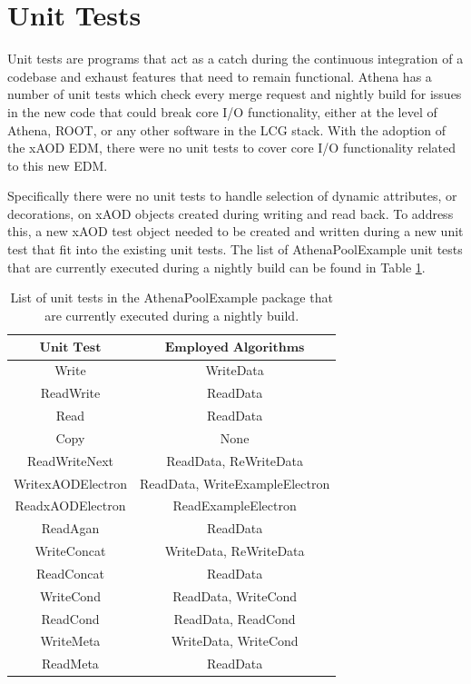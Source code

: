 \section{Unit Tests}
\label{sec:Mod_utests_CI}
Unit tests are programs that act as a catch during the continuous integration of a codebase and exhaust features that need to remain functional. 
Athena has a number of unit tests which check every merge request and nightly build for issues in the new code that could break core I/O functionality, either at the level of Athena, ROOT, or any other software in the LCG stack.
With the adoption of the xAOD EDM, there were no unit tests to cover core I/O functionality related to this new EDM. 

Specifically there were no unit tests to handle selection of dynamic attributes, or decorations, on xAOD objects created during writing and read back.
To address this, a new xAOD test object needed to be created and written during a new unit test that fit into the existing unit tests.
The list of AthenaPoolExample unit tests that are currently executed during a nightly build can be found in Table \ref{tab:CI_Unit_Tests}.

\begin{table}[h]
    \centering
    \begin{tabular}{|c|c|}
        \hline
        $\textbf{Unit Test}$ & $\textbf{Employed Algorithms}$ \\
        \hline
        Write & WriteData \\
        \hline
        ReadWrite & ReadData \\
        \hline
        Read & ReadData \\
        \hline
        Copy & None \\
        \hline
        ReadWriteNext & ReadData, ReWriteData \\
        \hline
        WritexAODElectron & ReadData, WriteExampleElectron \\
        \hline
        ReadxAODElectron & ReadExampleElectron \\
        \hline
        ReadAgan & ReadData \\
        \hline
        WriteConcat & WriteData, ReWriteData \\
        \hline
        ReadConcat & ReadData \\
        \hline
        WriteCond & ReadData, WriteCond \\
        \hline
        ReadCond & ReadData, ReadCond \\
        \hline
        WriteMeta & WriteData, WriteCond \\
        \hline
        ReadMeta & ReadData \\
        \hline
    \end{tabular}
    \caption{List of unit tests in the AthenaPoolExample package that are currently executed during a nightly build.}
    \label{tab:CI_Unit_Tests}
\end{table}

